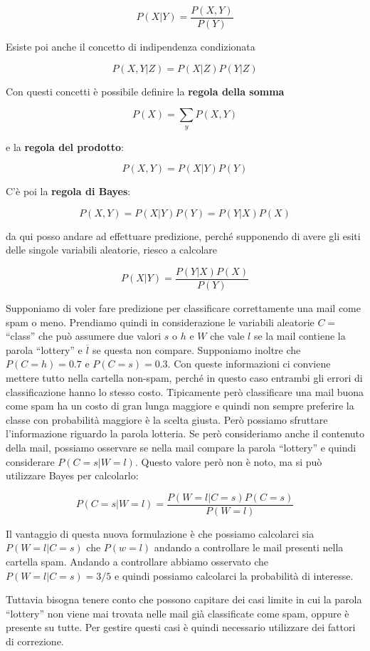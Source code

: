 $$
P(X | Y) = \frac{P(X,Y)}{P(Y)}
$$

\noindent Esiste poi anche il concetto di indipendenza condizionata

$$
P(X,Y | Z) = P(X|Z) P(Y|Z)
$$

\noindent Con questi concetti è possibile definire la \textbf{regola della somma}

$$
P(X) = \sum\limits_{y} P(X,Y)
$$

\noindent e la \textbf{regola del prodotto}:

$$
P(X,Y) = P(X|Y)P(Y)
$$

\noindent C'è poi la \textbf{regola di Bayes}:

$$
P(X,Y) = P(X|Y)P(Y) = P(Y|X)P(X)
$$

\noindent da qui posso andare ad effettuare predizione, perché supponendo di avere gli esiti delle singole variabili aleatorie, riesco a calcolare

$$
P(X|Y) = \frac{P(Y|X)P(X)}{P(Y)}
$$

\noindent Supponiamo di voler fare predizione per classificare correttamente una mail come spam o meno. Prendiamo quindi in considerazione le variabili aleatorie $C = $ ``class'' che può assumere due valori $s$ o $h$ e $W$ che vale $l$ se la mail contiene la parola ``lottery'' e $\overline{l}$ se questa non compare.
Supponiamo inoltre che $P(C = h) = 0.7$ e $P(C = s) = 0.3$. Con queste informazioni ci conviene mettere tutto nella cartella non-spam, perché in questo caso entrambi gli errori di classificazione hanno lo stesso costo. Tipicamente però classificare una mail buona come spam ha un costo di gran lunga maggiore e quindi non sempre preferire la classe con probabilità maggiore è la scelta giusta.
Però possiamo sfruttare l'informazione riguardo la parola lotteria. Se però consideriamo anche il contenuto della mail, possiamo osservare se nella mail compare la parola ``lottery'' e quindi considerare $P(C = s | W = l)$. Questo valore però non è noto, ma si può utilizzare Bayes per calcolarlo:

$$
P(C = s | W = l) = \frac{P(W = l | C = s)P(C=s)}{P(W = l)}
$$

\noindent Il vantaggio di questa nuova formulazione è che possiamo calcolarci sia $P(W = l | C = s)$ che $P(w = l)$ andando a controllare le mail presenti nella cartella spam.
Andando a controllare abbiamo osservato che $P(W = l | C = s) = 3/5$ e quindi possiamo calcolarci la probabilità di interesse.

Tuttavia bisogna tenere conto che possono capitare dei casi limite in cui la parola ``lottery'' non viene mai trovata nelle mail già classificate come spam, oppure è presente su tutte. Per gestire questi casi è quindi necessario utilizzare dei fattori di correzione.

